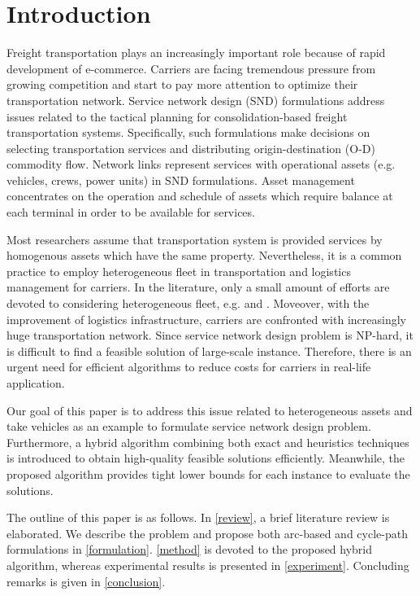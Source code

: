 \documentclass[11pt,nonblindrev,fleqn]{article}
\begin{document}
\section{Introduction}
Freight transportation plays an increasingly important role because of rapid development of e-commerce. Carriers are facing tremendous pressure from growing competition and start to pay more attention to optimize their transportation network. Service network design (SND) formulations address issues related to the tactical planning for consolidation-based freight transportation systems. Specifically, such formulations make decisions on selecting transportation services and distributing origin-destination (O-D) commodity flow. Network links represent services with operational assets (e.g. vehicles, crews, power units) in SND formulations. Asset management concentrates on the operation and schedule of assets which require balance at each terminal in order to be available for services.

Most researchers assume that transportation system is provided services by homogenous assets which have the same property. Nevertheless, it is a common practice to employ heterogeneous fleet in transportation and logistics management for carriers. In the literature, only a small amount of efforts are devoted to considering heterogeneous fleet, e.g. \cite{Kim1999Multimodal} and \cite{li2017design}. Moveover, with the improvement of logistics infrastructure, carriers are confronted with increasingly huge transportation network. Since service network design problem is NP-hard, it is difficult to find a feasible solution of large-scale instance. Therefore, there is an urgent need for efficient algorithms to reduce costs for carriers in real-life application.

Our goal of this paper is to address this issue related to heterogeneous assets and take vehicles as an example to formulate service network design problem. Furthermore, a hybrid algorithm combining both exact and heuristics techniques is introduced to obtain high-quality feasible solutions efficiently. Meanwhile, the proposed algorithm provides tight lower bounds for each instance to evaluate the solutions.

The outline of this paper is as follows. In \autoref{review}, a brief literature review is elaborated. We describe the problem and propose both arc-based and cycle-path formulations in \autoref{formulation}. \autoref{method} is devoted to the proposed hybrid algorithm, whereas experimental results is presented in \autoref{experiment}. Concluding remarks is given in \autoref{conclusion}.
\end{document}
